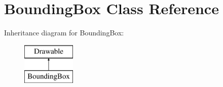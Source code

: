 \hypertarget{class_bounding_box}{}\section{Bounding\+Box Class Reference}
\label{class_bounding_box}
Inheritance diagram for Bounding\+Box\+:\begin{figure}[H]
\begin{center}
\leavevmode
\includegraphics[height=2.000000cm]{class_bounding_box}
\end{center}
\end{figure}
